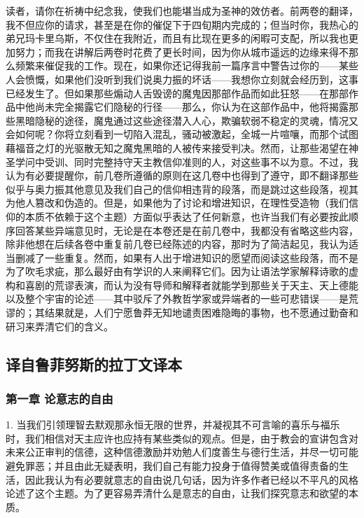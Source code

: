 读者，请你在祈祷中纪念我，使我们也能堪当成为圣神的效仿者。前两卷的翻译，我不但应你的请求，甚至是在你的催促下于四旬期内完成的；但当时你，我热心的弟兄玛卡里乌斯，不仅住在我附近，而且有比现在更多的闲暇可支配，所以我也更加努力；而我在讲解后两卷时花费了更长时间，因为你从城市遥远的边缘来得不那么频繁来催促我的工作。现在，如果你还记得我前一篇序言中警告过你的——某些人会愤慨，如果他们没听到我们说奥力振的坏话——我想你立刻就会经历到，这事已经发生了。但如果那些煽动人舌毁谤的魔鬼因那部作品而如此狂怒——在那部作品中他尚未完全揭露它们隐秘的行径——那么，你认为在这部作品中，他将揭露那些黑暗隐秘的途径，魔鬼通过这些途径潜入人心，欺骗软弱不稳定的灵魂，情况又会如何呢？你将立刻看到一切陷入混乱，骚动被激起，全城一片喧嚷，而那个试图藉福音之灯的光驱散无知之魔鬼黑暗的人被传来接受判决。然而，让那些渴望在神圣学问中受训、同时完整持守天主教信仰准则的人，对这些事不以为意。不过，我认为有必要提醒你，前几卷所遵循的原则在这几卷中也得到了遵守，即不翻译那些似乎与奥力振其他意见及我们自己的信仰相违背的段落，而是跳过这些段落，视其为他人篡改和伪造的。但是，如果他为了讨论和增进知识，在理性受造物（我们信仰的本质不依赖于这个主题）方面似乎表达了任何新意，也许当我们有必要按此顺序回答某些异端意见时，无论是在本卷还是在前几卷中，我都没有省略这些内容，除非他想在后续各卷中重复前几卷已经陈述的内容，那时为了简洁起见，我认为适当删减了一些重复。然而，如果有人出于增进知识的愿望而阅读这些段落，而不是为了吹毛求疵，那么最好由有学识的人来阐释它们。因为让语法学家解释诗歌的虚构和喜剧的荒谬表演，而认为没有导师和解释者就能学到那些关于天主、天上德能以及整个宇宙的论述——其中驳斥了外教哲学家或异端者的一些可悲错误——是荒谬的；其结果就是，人们宁愿鲁莽无知地谴责困难隐晦的事物，也不愿通过勤奋和研习来弄清它们的含义。\par


\subsection{译自鲁菲努斯的拉丁文译本}


\subsubsection{第一章 论意志的自由}

1. 当我们引领理智去默观那永恒无限的世界，并凝视其不可言喻的喜乐与福乐时，我们相信对天主应许也应持有某些类似的观点。但是，由于教会的宣讲包含对未来公正审判的信德，这种信德激励并劝勉人们度善生与德行生活，并尽一切可能避免罪恶；并且由此无疑表明，我们自己有能力投身于值得赞美或值得责备的生活，因此我认为有必要就意志的自由说几句话，因为许多作者已经以不平凡的风格论述了这个主题。为了更容易弄清什么是意志的自由，让我们探究意志和欲望的本质。\par

